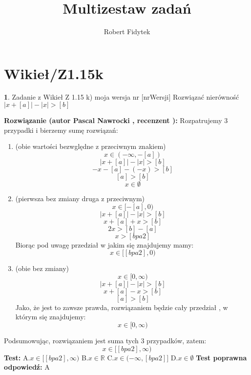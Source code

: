 \documentclass[12pt, a4paper]{article}
\title{Multizestaw zadań}
\author{Robert Fidytek}
\date{}
\theoremstyle{definition} %
\newtheorem{zad}{}
\newcommand{\kategoria}[1]{\section{#1}} %
\newcommand{\zadStart}[1]{\begin{zad}#1\newline} %
\newcommand{\zadStop}{\end{zad}}   %
\newcommand{\rozwStart}[2]{\noindent \textbf{Rozwiązanie (autor #1 , recenzent #2): }\newline} %
\newcommand{\odpStop}{\newline}                                             %
\newcommand{\testStart}{\noindent \textbf{Test:}\newline} %
\newcommand{\testStop}{\newline} %
\newcommand{\kluczStart}{\noindent \textbf{Test poprawna odpowiedź:}\newline} %
\newcommand{\kluczStop}{\newline} %
\begin{document}
\maketitle



\kategoria{Wikieł/Z1.15k}
\zadStart{Zadanie z Wikieł Z 1.15 k) moja wersja nr [nrWersji]}
Rozwiązać nierówność $|x+[a]|-|x|>[b]$
\zadStop
\rozwStart{Pascal Nawrocki}{}
Rozpatrujemy 3 przypadki i bierzemy sumę rozwiązań:
\begin{enumerate}
\item (obie wartości bezwględne z przeciwnym znakiem) $$x\in(-\infty,-[a])$$ 
$$|x+[a]|-|x|>[b]$$
$$-x-[a]-(-x)>[b]$$
$$[a]>[b]$$
$$x\in\emptyset$$
\item (pierwsza bez zmiany druga z przeciwnym)$$x\in[-[a],0)$$ 
$$|x+[a]|-|x|>[b]$$
$$x+[a]+x>[b]$$
$$2x>[b]-[a]$$
$$x>[bpa2]$$
Biorąc pod uwagę przedział w jakim się znajdujemy mamy:
$$x\in[[bpa2],0)$$
\item (obie bez zmiany) $$x\in[0,\infty)$$ 
$$|x+[a]|-|x|>[b]$$
$$x+[a]-x>[b]$$
$$[a]>[b]$$
Jako, że jest to zawsze prawda, rozwiązaniem będzie cały przedział , w którym się znajdujemy:
$$x\in[0,\infty)$$
\end{enumerate}
Podsumowując, rozwiązaniem jest suma tych 3 przypadków, zatem:
$$x\in[[bpa2],\infty)$$
\odpStop
\testStart
A.$x\in[[bpa2],\infty)$
B.$x\in\mathbb{R}$
C.$x\in(-\infty,[bpa2]]$
D.$x\in\emptyset$
\testStop
\kluczStart
A
\kluczStop
\end{document}
